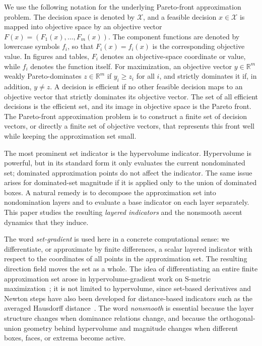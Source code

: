 \documentclass{article}
\begin{document}
We use the following notation for the underlying Pareto-front approximation problem.  The decision space is denoted by $\mathcal X$, and a feasible decision $x\in\mathcal X$ is mapped into objective space by an objective vector $F(x)=(F_1(x),\dots,F_m(x))$.  The component functions are denoted by lowercase symbols $f_i$, so that $F_i(x)=f_i(x)$ is the corresponding objective value.  In figures and tables, $F_i$ denotes an objective-space coordinate or value, while $f_i$ denotes the function itself.  For maximization, an objective vector $y\in\mathbb R^m$ weakly Pareto-dominates $z\in\mathbb R^m$ if $y_i\ge z_i$ for all $i$, and strictly dominates it if, in addition, $y\ne z$.  A decision is efficient if no other feasible decision maps to an objective vector that strictly dominates its objective vector.  The set of all efficient decisions is the efficient set, and its image in objective space is the Pareto front.  The Pareto-front approximation problem is to construct a finite set of decision vectors, or directly a finite set of objective vectors, that represents this front well while keeping the approximation set small.

The most prominent set indicator is the hypervolume indicator.  Hypervolume is powerful, but in its standard form it only evaluates the current nondominated set; dominated approximation points do not affect the indicator.  The same issue arises for dominated-set magnitude if it is applied only to the union of dominated boxes.  A natural remedy is to decompose the approximation set into nondomination layers and to evaluate a base indicator on each layer separately.  This paper studies the resulting \emph{layered indicators} and the nonsmooth ascent dynamics that they induce.

The word \emph{set-gradient} is used here in a concrete computational sense: we differentiate, or approximate by finite differences, a scalar layered indicator with respect to the coordinates of all points in the approximation set.  The resulting direction field moves the set as a whole.  The idea of differentiating an entire finite approximation set arose in hypervolume-gradient work on S-metric maximization~\cite{emmerichdeutzbeume2007}; it is not limited to hypervolume, since set-based derivatives and Newton steps have also been developed for distance-based indicators such as the averaged Hausdorff distance~\cite{uribeetal2020hausdorffnewton}.  The word \emph{nonsmooth} is essential because the layer structure changes when dominance relations change, and because the orthogonal-union geometry behind hypervolume and magnitude changes when different boxes, faces, or extrema become active.
\end{document}
